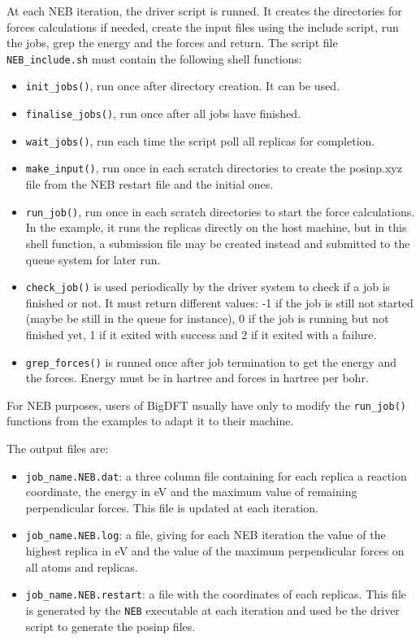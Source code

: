 \documentclass[a4paper,11pt]{report}
\begin{document}
At each NEB iteration, the driver script is runned. It creates the directories for forces calculations if needed, create the input files using the include script, run the jobs, grep the energy and the forces and return. The script file \texttt{NEB\_include.sh} must contain the following shell functions:
\begin{itemize}
  \item \texttt{init\_jobs()}, run once after directory creation. It can be used.
  \item \texttt{finalise\_jobs()}, run once after all jobs have finished.
  \item \texttt{wait\_jobs()}, run each time the script poll all replicas for completion.
  \item \texttt{make\_input()}, run once in each scratch directories to create the posinp.xyz file from the NEB restart file and the initial ones.
  \item \texttt{run\_job()}, run once in each scratch directories to start the force calculations. In the example, it runs the replicas directly on the host machine, but in this shell function, a submission file may be created instead and submitted to the queue system for later run.
  \item \texttt{check\_job()} is used periodically by the driver system to check if a job is finished or not. It must return different values: -1 if the job is still not started (maybe be still in the queue for instance), 0 if the job is running but not finished yet, 1 if it exited with success and 2 if it exited with a failure.
  \item \texttt{grep\_forces()} is runned once after job termination to get the energy and the forces. Energy must be in hartree and forces in hartree per bohr.
  \end{itemize}
For NEB purposes, users of BigDFT usually have only to modify the \texttt{run\_job()} functions from the examples to adapt it to their machine.

The output files are:
\begin{itemize}
  \item \texttt{job\_name.NEB.dat}: a three column file containing for each replica a reaction coordinate, the energy in eV and the maximum value of remaining perpendicular forces. This file is updated at each iteration.
  \item \texttt{job\_name.NEB.log}: a file, giving for each NEB iteration the value of the highest replica in eV and the value of the maximum perpendicular forces on all atoms and replicas.
  \item \texttt{job\_name.NEB.restart}: a file with the coordinates of each replicas. This file is generated by the \texttt{NEB} executable at each iteration and used be the driver script to generate the posinp files.
\end{itemize}
\end{document}
